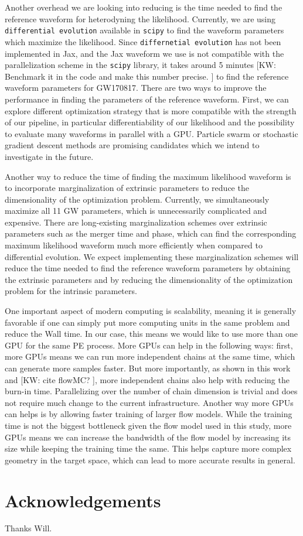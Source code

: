 \documentclass[twocolumn]{aastex631}
\newcommand{\kw}[1]{{\color{rb4}[KW: #1 ]}}
\begin{document}
Another overhead we are looking into reducing is the time needed to find the
reference waveform for heterodyning the likelihood. Currently, we are using
\texttt{differential evolution} available in \texttt{scipy} to find the waveform
parameters which maximize the likelihood. Since \texttt{differnetial evolution}
has not been implemented in Jax, and the Jax waveform we use is not compatible
with the parallelization scheme in the \texttt{scipy} library, it takes around 5
minutes \kw{Benchmark it in the code and make this number precise.} to find the
reference waveform parameters for GW170817. There are two ways to improve the
performance in finding the parameters of the reference waveform. First, we can
explore different optimization strategy that is more compatible with the
strength of our pipeline, in particular differentiability of our likelihood and
the possibility to evaluate many waveforms in parallel with a GPU. Particle
swarm or stochastic gradient descent methods are promising candidates which we
intend to investigate in the future. 

Another way to reduce the time of finding the maximum likelihood waveform is to
incorporate marginalization of extrinsic parameters to reduce the dimensionality
of the optimization problem. Currently, we simultaneously maximize all 11 GW
parameters, which is unnecessarily complicated and expensive. There are
long-existing marginalization schemes over extrinsic parameters such as the merger
time and phase, which can find the corresponding maximum likelihood waveform
much more efficiently when compared to differential evolution. We expect
implementing these marginalization schemes will reduce the time needed to find
the reference waveform parameters by obtaining the extrinsic parameters and by
reducing the dimensionality of the optimization problem for the intrinsic
parameters.

One important aspect of modern computing is scalability, meaning it is generally
favorable if one can simply put more computing units in the same problem and
reduce the Wall time. In our case, this means we would like to use more than one
GPU for the same PE process. More GPUs can help in the following ways: first,
more GPUs means we can run more independent chains at the same time, which can
generate more samples faster. But more importantly, as shown in this work and
\kw{cite flowMC?}, more independent chains also help with reducing the burn-in
time. Parallelizing over the number of chain dimension is trivial and does not
require much change to the current infrastructure. Another way more GPUs can
helps is by allowing faster training of larger flow models. While the training time
is not the biggest bottleneck given the flow model used in this study, more GPUs
means we can increase the bandwidth of the flow model by increasing its size
while keeping the training time the same. This helps capture more complex
geometry in the target space, which can lead to more accurate results in general.


\section{Acknowledgements}
Thanks Will.


\end{document}

